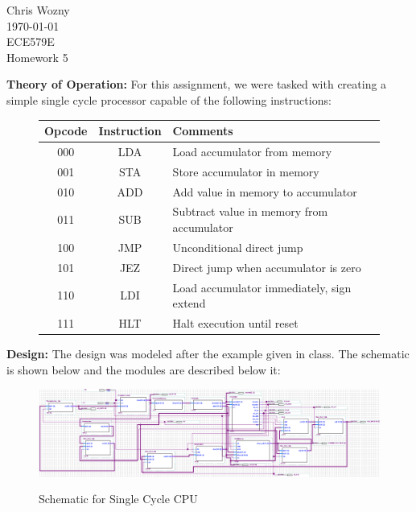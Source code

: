 \documentclass{article}         %
\begin{document}
\flushright
Chris Wozny\\
\today\\
ECE579E\\
Homework 5\\
\flushleft

\textbf{Theory of Operation:} For this assignment, we were tasked with creating a simple single cycle processor capable of the following instructions:\\

\begin{figure}[H]
\begin{center}
\begin{tabular}{ |c|c|l| }\hline
  \textbf{Opcode} & \textbf{Instruction} & \textbf{Comments} \\\hline
  000 & LDA & Load accumulator from memory\\\hline
  001 & STA & Store accumulator in memory\\\hline
  010 & ADD & Add value in memory to accumulator \\\hline
  011 & SUB & Subtract value in memory from accumulator \\\hline
  100 & JMP & Unconditional direct jump \\\hline
  101 & JEZ & Direct jump when accumulator is zero \\\hline
  110 & LDI & Load accumulator immediately, sign extend \\\hline
  111 & HLT & Halt execution until reset \\\hline
\end{tabular}
\end{center}
\end{figure}

\textbf{Design:} The design was modeled after the example given in class. The schematic is shown below and the modules are described below it:\\

\begin{figure}[H]
\begin{center}
\includegraphics[scale=0.3]{schematic.png}\\
\end{center}
\caption{Schematic for Single Cycle CPU}
\end{figure}
\end{document}
